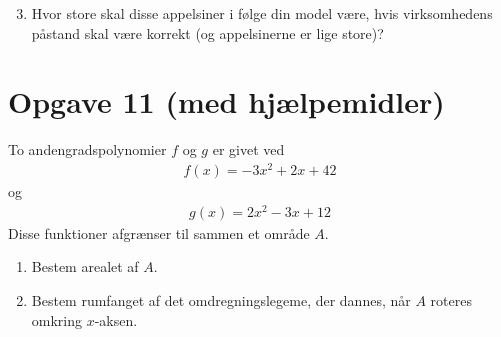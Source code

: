 \documentclass[12pt]{article}
\begin{document}
\begin{enumerate}[label=\roman*)]
\setcounter{enumi}{2}
\item Hvor store skal disse appelsiner i følge din model være, hvis virksomhedens påstand skal være korrekt (og appelsinerne er lige store)?
\end{enumerate}

\section*{Opgave 11 (med hjælpemidler)}
To andengradspolynomier $f$ og $g$ er givet ved
\begin{align*}
	f(x) = -3x^2 + 2x + 42
\end{align*}
og 
\begin{align*}
	g(x) = 2x^2 - 3x + 12
\end{align*}
Disse funktioner afgrænser til sammen et område $A$. 
\begin{enumerate}[label=\roman*)]
\item Bestem arealet af $A$.
\item Bestem rumfanget af det omdregningslegeme, der dannes, når $A$ roteres omkring $x$-aksen.
\end{enumerate}
\end{document}
